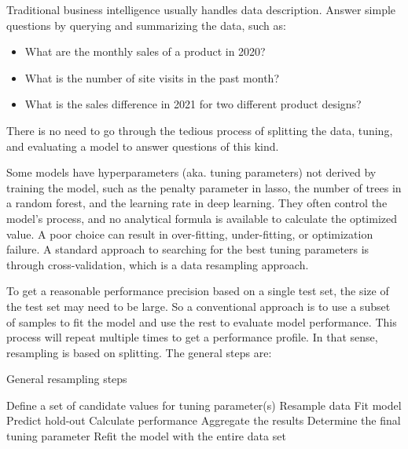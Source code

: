 \documentclass[
  12pt,
]{krantz}
\providecommand{\tightlist}{%
  \setlength{\itemsep}{0pt}\setlength{\parskip}{0pt}}
\begin{document}
Traditional business intelligence usually handles data description. Answer simple questions by querying and summarizing the data, such as:

\begin{itemize}
\tightlist
\item
  What are the monthly sales of a product in 2020?
\item
  What is the number of site visits in the past month?
\item
  What is the sales difference in 2021 for two different product designs?
\end{itemize}

There is no need to go through the tedious process of splitting the data, tuning, and evaluating a model to answer questions of this kind.

Some models have hyperparameters (aka. tuning parameters) not derived by training the model, such as the penalty parameter in lasso, the number of trees in a random forest, and the learning rate in deep learning. They often control the model's process, and no analytical formula is available to calculate the optimized value. A poor choice can result in over-fitting, under-fitting, or optimization failure. A standard approach to searching for the best tuning parameters is through cross-validation, which is a data resampling approach.

To get a reasonable performance precision based on a single test set, the size of the test set may need to be large. So a conventional approach is to use a subset of samples to fit the model and use the rest to evaluate model performance. This process will repeat multiple times to get a performance profile. In that sense, resampling is based on splitting. The general steps are:

\begin{algorithm}
\caption{General resampling steps}\label{resampling} 
\begin{algorithmic}[1] 
\State Define a set of candidate values for tuning parameter(s)
\State Resample data
        \State Fit model
        \State Predict hold-out
        \State Calculate performance
    \EndFor
\State Aggregate the results
\State Determine the final tuning parameter
\State Refit the model with the entire data set
\end{algorithmic}
\end{algorithm}
\end{document}
